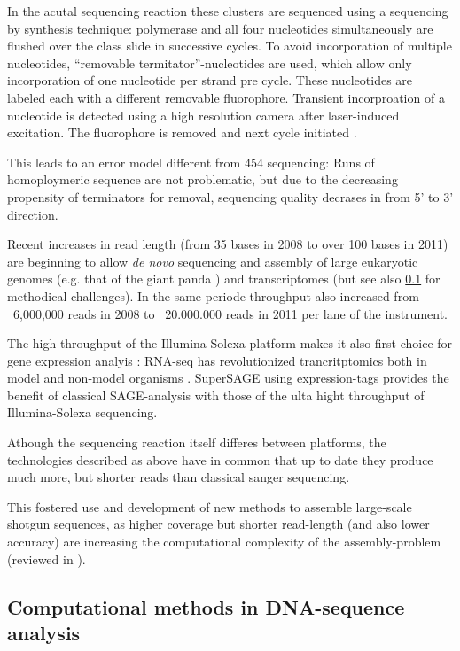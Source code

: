 In the acutal sequencing reaction these clusters are sequenced using a
sequencing by synthesis technique: polymerase and all four nucleotides
simultaneously are flushed over the class slide in successive
cycles. To avoid incorporation of multiple nucleotides, ``removable
termitator''-nucleotides are used, which allow only incorporation of
one nucleotide per strand pre cycle. These nucleotides are labeled
each with a different removable fluorophore. Transient incorproation
of a nucleotide is detected using a high resolution camera after
laser-induced excitation. The fluorophore is removed and next cycle
initiated \cite{pmid18987734}.

This leads to an error model different from 454 sequencing: Runs of
homoploymeric sequence are not problematic, but due to the decreasing
propensity of terminators for removal, sequencing quality decrases in
from 5' to 3' direction.

Recent increases in read length (from 35 bases in 2008 to over 100
bases in 2011) are beginning to allow \textit{de novo} sequencing and
assembly of large eukaryotic genomes (e.g. that of the giant panda
\cite{pmid20010809}) and transcriptomes \cite{pmid21679424} (but see
also \ref{sec:comp-meth-dna} for methodical challenges). In the same
periode throughput also increased from ~6,000,000 reads in 2008 to
~20.000.000 reads in 2011 per lane of the instrument.

The high throughput of the Illumina-Solexa platform makes it also
first choice for gene expression analyis \cite{pmid21627854}: RNA-seq
has revolutionized trancritptomics both in model and non-model
organisms \cite{pmid19015660}. SuperSAGE \cite{pmid20967605} using
expression-tags provides the benefit of classical SAGE-analysis
\cite{pmid7570003} with those of the ulta hight throughput of
Illumina-Solexa sequencing.

Athough the sequencing reaction itself differes between platforms, the
technologies described as above have in common that up to date they
produce much more, but shorter reads than classical sanger sequencing.

This fostered use and development of new methods to assemble
large-scale shotgun sequences, as higher coverage but shorter
read-length (and also lower accuracy) are increasing the computational
complexity of the assembly-problem (reviewed in \cite{pmid20211242}).

\subsection{Computational methods in DNA-sequence analysis}
\label{sec:comp-meth-dna}

